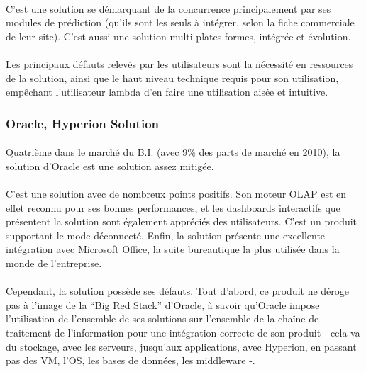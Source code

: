 \paragraph{} C’est une solution se démarquant de la concurrence principalement par ses modules de prédiction (qu’ils sont les seuls à intégrer, selon la fiche commerciale de leur site).
C’est aussi une solution multi plates-formes, intégrée et évolution.

\paragraph{} Les principaux défauts relevés par les utilisateurs sont la nécessité en ressources de la solution, ainsi que le haut niveau technique requis pour son utilisation, empêchant l’utilisateur lambda d’en faire une utilisation aisée et intuitive.

\subsubsection{Oracle, Hyperion Solution}

\paragraph{} Quatrième dans le marché du B.I. (avec 9\% des parts de marché en 2010), la solution d’Oracle est une solution assez mitigée.

\paragraph{} C’est une solution avec de nombreux points positifs. Son moteur OLAP est en effet reconnu pour ses bonnes performances, et les dashboards interactifs que présentent la solution sont également appréciés des utilisateurs. C’est un produit supportant le mode déconnecté. Enfin, la solution présente une excellente intégration avec Microsoft Office, la suite bureautique la plus utilisée dans la monde de l’entreprise.

\paragraph{} Cependant, la solution possède ses défauts. Tout d’abord, ce produit ne déroge pas à l’image de la “Big Red Stack” d’Oracle, à savoir qu’Oracle impose l’utilisation de l’ensemble de ses solutions sur l’ensemble de la chaîne de traitement de l’information pour une intégration correcte de son produit - cela va du stockage, avec les serveurs, jusqu’aux applications, avec Hyperion, en passant pas des VM, l’OS, les bases de données, les middleware -.

